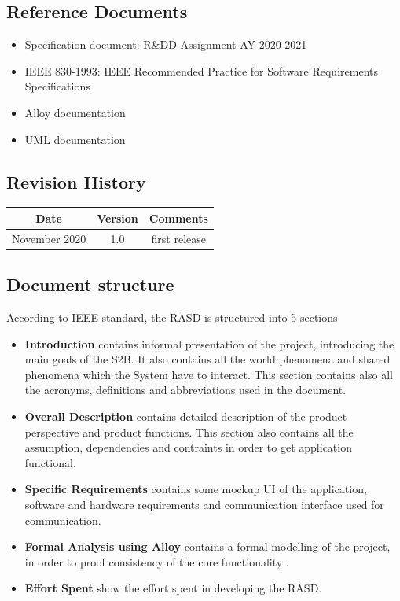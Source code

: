 \documentclass[a4paper, 12pt, oneside]{article}
\begin{document}
\subsection{Reference Documents}
\begin{itemize}
    \item Specification document: R\&DD Assignment AY 2020-2021
    \item IEEE 830-1993: IEEE Recommended Practice for Software Requirements Specifications
    \item Alloy documentation 
    \item UML documentation 
\end{itemize}

\subsection{Revision History}
\begin{center}
 \begin{tabular}{||c c c||}
 \hline
 Date & Version & Comments \\ [0.5ex] 
 \hline\hline
 November 2020 & 1.0 & first release \\ 
 \hline
 \hline
\end{tabular}
\end{center}

\subsection{Document structure}
According to IEEE standard, the RASD is structured into 5 sections
\begin{itemize}
    \item \textbf{Introduction} contains informal presentation of the project, introducing the main goals of the S2B. It also contains all the world phenomena and shared phenomena which the System have to interact. This section contains also all the acronyms, definitions and abbreviations used in the document.
    \item \textbf{Overall Description} contains detailed description of the product perspective and product functions. This section also contains all the assumption, dependencies and contraints in order to get application functional.
    \item \textbf{Specific Requirements} contains some mockup UI of the application, software and hardware requirements and communication interface used for communication.
    \item \textbf{Formal Analysis using Alloy} contains a formal modelling of the project, in order to proof consistency of the core functionality .
    \item \textbf{Effort Spent} show the effort spent in developing the RASD.
\end{itemize}
\end{document}
